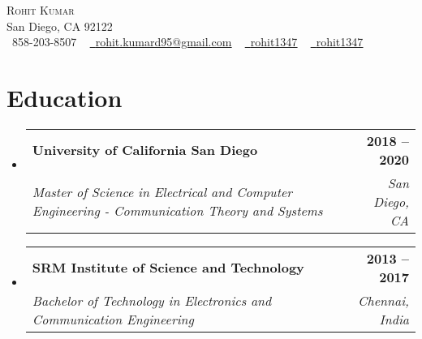 \documentclass[letterpaper,11pt]{article}
\makeatletter
\newcommand{\resumeSubheading}[4]{
  \vspace{-2pt}\item
    \begin{tabular*}{1.0\textwidth}[t]{l@{\extracolsep{\fill}}r}
      \textbf{#1} & \textbf{\small #2} \\
      \textit{\small#3} & \textit{\small #4} \\
    \end{tabular*}\vspace{-7pt}
}
\newcommand{\resumeSubHeadingListStart}{\begin{itemize}[leftmargin=0.0in, label={}]}
\newcommand{\resumeSubHeadingListEnd}{\end{itemize}}
\makeatother
\begin{document}

\begin{center}
    {\Huge \scshape Rohit Kumar} \\ \vspace{1pt}
    San Diego, CA 92122 \\ \vspace{1pt}
    \small \raisebox{-0.1\height}\faPhone\ 858-203-8507 ~ \href{mailto:rokumar@ucsd.edu}{\raisebox{-0.2\height}\faEnvelope\  \underline{rohit.kumard95@gmail.com}} ~ 
    \href{https://www.linkedin.com/in/rohit1347/}{\raisebox{-0.2\height}\faLinkedin\ \underline{rohit1347}}  ~
    \href{https://github.com/rohit1347}{\raisebox{-0.2\height}\faGithub\ \underline{rohit1347}}
    \vspace{-8pt}
\end{center}


\section{Education}
  \resumeSubHeadingListStart
    \resumeSubheading
      {University of California San Diego}{2018 -- 2020}
      {Master of Science in Electrical and Computer Engineering - Communication Theory and Systems}{San Diego, CA}
       \resumeSubheading
      {SRM Institute of Science and Technology}{2013 -- 2017}
      {Bachelor of Technology in Electronics and Communication Engineering}{Chennai, India}
  \resumeSubHeadingListEnd

\end{document}
